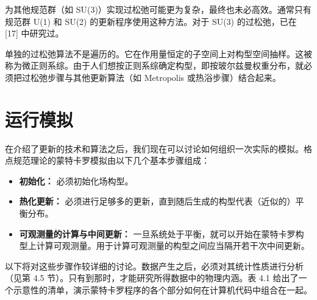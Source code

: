 为其他规范群（如 SU(3)）实现过松弛可能更为复杂，最终也未必高效。通常只有规范群 U(1) 和 SU(2) 的更新程序使用这种方法。对于 SU(3) 的过松弛，已在 [17] 中研究过。

单独的过松弛算法不是遍历的。它在作用量恒定的子空间上对构型空间抽样。这被称为微正则系综。由于人们想按正则系综确定构型，即按玻尔兹曼权重分布，就必须把过松弛步骤与其他更新算法（如 Metropolis 或热浴步骤）结合起来。

\section{运行模拟}

在介绍了更新的技术和算法之后，我们现在可以讨论如何组织一次实际的模拟。格点规范理论的蒙特卡罗模拟由以下几个基本步骤组成：

\begin{itemize}
  \item \textbf{初始化：} 必须初始化场构型。
  \item \textbf{热化更新：} 必须进行足够多的更新，直到随后生成的构型代表（近似的）平衡分布。
  \item \textbf{可观测量的计算与中间更新：} 一旦系统处于平衡，就可以开始在蒙特卡罗构型上计算可观测量。用于计算可观测量的构型之间应当隔开若干次中间更新。
\end{itemize}

以下将对这些步骤作较详细的讨论。数据产生之后，必须对其统计性质进行分析（见第 4.5 节）。只有到那时，才能研究所得数据中的物理内涵。表 4.1 给出了一个示意性的清单，演示蒙特卡罗程序的各个部分如何在计算机代码中组合在一起。

